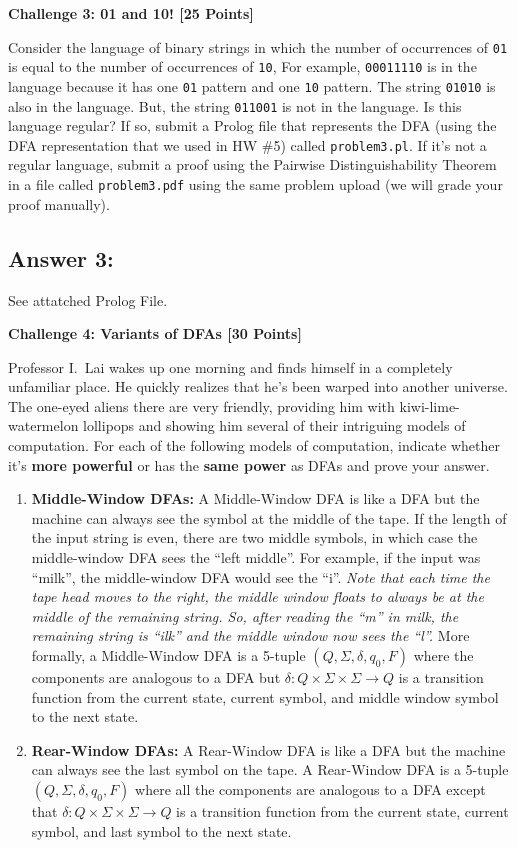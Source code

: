 \documentclass[12pt]{article}
\newcommand{\Problem}[3]{\mbox{} \newline \noindent \textbf{\textbf{Challenge #1: #2 [#3 Points] \\ }}}
\begin{document}
\Problem{3}{01 and 10!}{25}

Consider the language of binary strings in which the number of occurrences of \verb+01+ is equal to the number of occurrences of \verb+10+,  For example,
\verb+00011110+ is in the language because it has one \verb+01+ pattern and one \verb+10+ pattern.  The string \verb+01010+ is also in the language.  But, the string \verb+011001+ is not in the language.
Is this language regular?  If so, submit a Prolog file that represents the DFA (using the DFA representation that we used in HW \#5) called \verb+problem3.pl+.  If it's not a regular language, submit a proof using the Pairwise Distinguishability Theorem in a file called \verb+problem3.pdf+ using the same problem upload (we will grade your proof manually).
 
\subsection*{Answer 3:}
See attatched Prolog File.

\Problem{4}{Variants of DFAs}{30}

Professor I.~Lai wakes up one morning and finds himself in a completely unfamiliar place.  He quickly realizes that he's been warped into another universe.  The one-eyed aliens there are very friendly, providing him with kiwi-lime-watermelon lollipops and showing him several of their intriguing models of computation.  For each of the following models of computation, indicate whether it's \textbf{more powerful} or has the \textbf{same power} as DFAs and prove your answer.  
	
\begin{enumerate}

	\item \textbf{Middle-Window DFAs:}  A Middle-Window DFA is like a DFA but the machine can always see the symbol at the middle of the tape.  If the length of the input string is even, there are two middle symbols, in which case the middle-window DFA sees the ``left middle''.  For example, if the input was ``milk'', the middle-window DFA would see the ``i''.  \emph{Note that each time the tape head moves to the right, the middle window floats to always be at the middle of the remaining string.  So, after reading the ``m'' in milk, the remaining string is ``ilk'' and the middle window now sees the ``l''.}  More formally, a Middle-Window DFA is a 5-tuple $(Q, \Sigma, \delta, q_0, F)$ where the components are analogous to a DFA but $\delta: Q \times \Sigma \times \Sigma \rightarrow Q$ is a transition function from the current state, current symbol, and middle window symbol to the next state.
	
	\item \textbf{Rear-Window DFAs:}  A Rear-Window DFA is like a DFA but the machine can always see the last symbol on the tape. A  Rear-Window DFA is a 
	5-tuple $(Q, \Sigma, \delta, q_0, F)$ where all the components are analogous to a DFA except that $\delta:  Q \times \Sigma \times \Sigma \rightarrow Q$ is a transition function from the current state, current symbol, and last symbol to the next state.
		
\end{enumerate}
\end{document}
